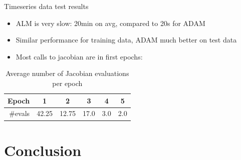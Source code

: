 \documentclass[11pt,t]{beamer}
\begin{document}
\begin{frame}[fragile]{Timeseries data test results}
\begin{table}
\renewcommand{\arraystretch}{1.3}
\centering
\footnotesize
{}
\end{table}
\begin{itemize}
	\item ALM is very slow: 20min on avg, compared to 20s for ADAM
	\item Similar performance for training data, ADAM much better on test data
	\item Most calls to jacobian are in first epochs:
\end{itemize}
\begin{table}[h!]
\footnotesize
\centering
\begin{tabular}{r| c c c c c }
Epoch	 	& 1	& 2 & 3 & 4 & 5 \\ \hline
\#evals & 42.25 & 12.75 & 17.0  &   3.0  &    2.0 \\
\end{tabular}
\caption*{Average number of Jacobian evaluations per epoch}
\label{jevaltab}
\end{table}
\end{frame}

\section{Conclusion}
\end{document}

